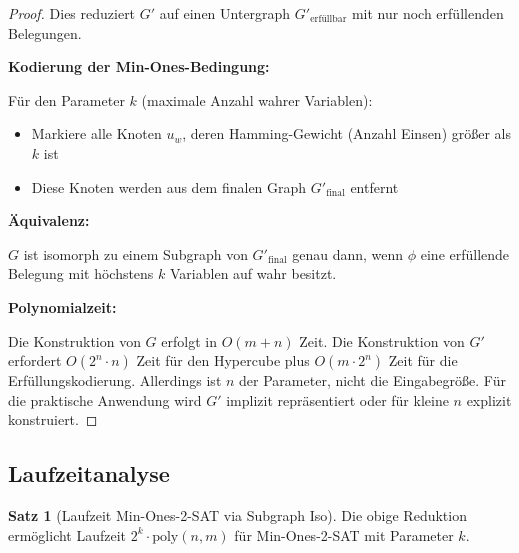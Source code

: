 ﻿\documentclass[a4paper,12pt]{article}
\theoremstyle{definition}
\newtheorem{satz}{Satz}[section]
\begin{document}
\begin{proof}
	Dies reduziert $G'$ auf einen Untergraph $G'_{\text{erfüllbar}}$ mit nur noch erfüllenden Belegungen.
	
	\textbf{Kodierung der Min-Ones-Bedingung:}
	
	Für den Parameter $k$ (maximale Anzahl wahrer Variablen):
	\begin{itemize}
		\item Markiere alle Knoten $u_w$, deren Hamming-Gewicht (Anzahl Einsen) größer als $k$ ist
		\item Diese Knoten werden aus dem finalen Graph $G'_{\text{final}}$ entfernt
	\end{itemize}
	
	\textbf{Äquivalenz:}
	
	$G$ ist isomorph zu einem Subgraph von $G'_{\text{final}}$ genau dann, wenn $\phi$ eine erfüllende Belegung mit höchstens $k$ Variablen auf wahr besitzt.
	
	\textbf{Polynomialzeit:}
	
	Die Konstruktion von $G$ erfolgt in $O(m + n)$ Zeit. Die Konstruktion von $G'$ erfordert $O(2^n \cdot n)$ Zeit für den Hypercube plus $O(m \cdot 2^n)$ Zeit für die Erfüllungskodierung. Allerdings ist $n$ der Parameter, nicht die Eingabegröße. Für die praktische Anwendung wird $G'$ implizit repräsentiert oder für kleine $n$ explizit konstruiert.
\end{proof}

\subsection{Laufzeitanalyse}

\begin{satz}[Laufzeit Min-Ones-2-SAT via Subgraph Iso]
	Die obige Reduktion ermöglicht Laufzeit $2^k \cdot \text{poly}(n, m)$ für Min-Ones-2-SAT mit Parameter $k$.
\end{satz}
\end{document}
